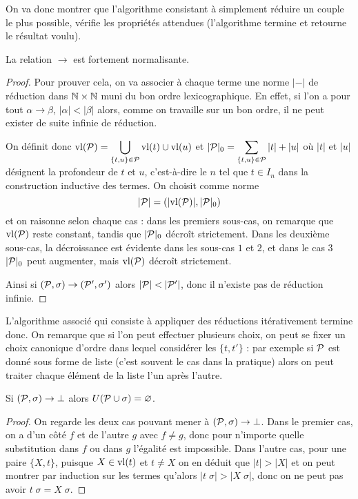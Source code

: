 On va donc montrer que l'algorithme consistant à simplement réduire un couple le plus possible, vérifie les propriétés attendues (l'algorithme termine et retourne le résultat voulu).

\begin{lem}
    La relation $\to$ est fortement normalisante.
\end{lem}

\begin{proof}
    Pour prouver cela, on va associer à chaque terme une \og norme\fg{} $|-|$ de réduction dans $\mathbb{N}\times\mathbb{N}$ muni du bon ordre lexicographique. En effet, si l'on a pour tout $\alpha\to\beta$, $|\alpha| < |\beta|$ alors, comme on travaille sur un bon ordre, il ne peut exister de suite infinie de réduction.

    On définit donc $\mathrm{vl}(\mathcal P) =\displaystyle{\bigcup_{\{t,u\}\in\mathcal P} \mathrm{vl}(t) \cup \mathrm{vl}(u)}$ et $|\mathcal P|_0 = \displaystyle{\sum_{\{t,u\}\in\mathcal P}|t|+|u|}$ où $|t|$ et $|u|$ désignent la profondeur de $t$ et $u$, c'est-à-dire le $n$ tel que $t\in I_n$ dans la construction inductive des termes. On choisit comme norme $$|\mathcal P| = (|\mathrm{vl}(\mathcal P) |,|\mathcal P|_0)$$ et on raisonne selon chaque cas : dans les premiers sous-cas, on remarque que $\mathrm{vl}(\mathcal P)$ reste constant, tandis que $|\mathcal P|_0$ décroît strictement. Dans les deuxième sous-cas, la décroissance est évidente dans les sous-cas $1$ et $2$, et dans le cas $3$ $|\mathcal P|_0$ peut augmenter, mais $\mathrm{vl}(\mathcal P)$ décroît strictement.

    Ainsi si $(\mathcal P,\sigma)\to(\mathcal P',\sigma')$ alors $|\mathcal P| < |\mathcal P'|$, donc il n'existe pas de réduction infinie.
\end{proof}

L'algorithme associé qui consiste à appliquer des réductions itérativement termine donc. On remarque que si l'on peut effectuer plusieurs choix, on peut se fixer un choix canonique d'ordre dans lequel considérer les $\{t,t'\}$ : par exemple si $\mathcal P$ est donné sous forme de liste (c'est souvent le cas dans la pratique) alors on peut traiter chaque élément de la liste l'un après l'autre.

\begin{lem}
    Si $(\mathcal P,\sigma)\to\bot$ alors $U(\mathcal P\cup\sigma)=\varnothing$.
\end{lem}

\begin{proof}
    On regarde les deux cas pouvant mener à $(\mathcal P,\sigma)\to\bot$. Dans le premier cas, on a d'un côté $f$ et de l'autre $g$ avec $f\neq g$, donc pour n'importe quelle substitution dans $f$ ou dans $g$ l'égalité est impossible. Dans l'autre cas, pour une paire $\{X,t\}$, puisque $X\in\mathrm{vl}(t)$ et $t\neq X$ on en déduit que $|t| > |X|$ et on peut montrer par induction sur les termes qu'alors $|t\;\sigma| > |X\;\sigma|$, donc on ne peut pas avoir $t\;\sigma = X\;\sigma$.
\end{proof}

